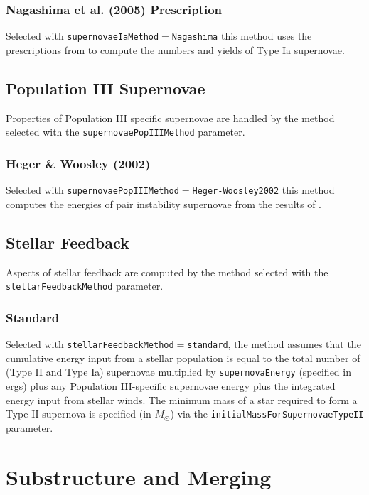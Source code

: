 \subsubsection{Nagashima et al. (2005) Prescription}

Selected with {\tt supernovaeIaMethod}$=${\tt Nagashima} this method uses the prescriptions from \cite{nagashima_metal_2005} to compute the numbers and yields of Type Ia supernovae.

\subsection{Population III Supernovae}

Properties of Population III specific supernovae are handled by the method selected with the {\tt supernovaePopIIIMethod} parameter.

\subsubsection{Heger \& Woosley (2002)}

Selected with {\tt supernovaePopIIIMethod}$=${\tt Heger-Woosley2002} this method computes the energies of pair instability supernovae from the results of \cite{heger_nucleosynthetic_2002}.

\subsection{Stellar Feedback}

Aspects of stellar feedback are computed by the method selected with the {\tt stellarFeedbackMethod} parameter.

\subsubsection{Standard}

Selected with {\tt stellarFeedbackMethod}$=${\tt standard}, the method assumes that the cumulative energy input from a stellar population is equal to the total number of (Type II and Type Ia) supernovae multiplied by {\tt supernovaEnergy} (specified in ergs) plus any Population III-specific supernovae energy plus the integrated energy input from stellar winds. The minimum mass of a star required to form a Type II supernova is specified (in $M_\odot$) via the {\tt initialMassForSupernovaeTypeII} parameter.

\section{Substructure and Merging}

